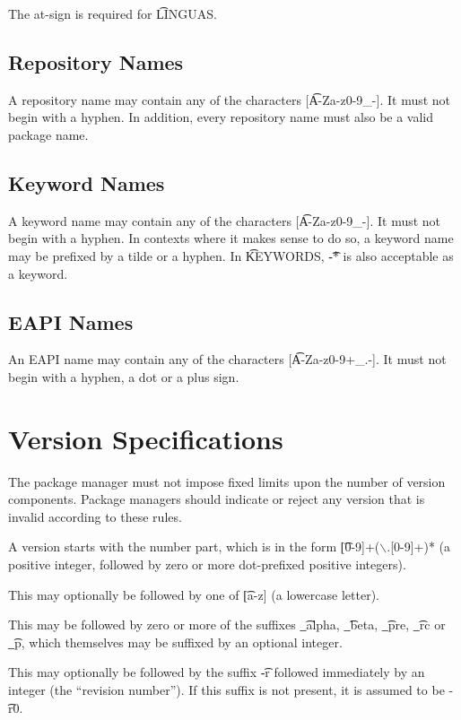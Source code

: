 \note The at-sign is required for \t{LINGUAS}.

\subsection{Repository Names}
\label{sec:repository-names}
A repository name may contain any of the characters [\t{A-Za-z0-9\_-}]. It must not begin with a
hyphen. In addition, every repository name must also be a valid package name.

\subsection{Keyword Names}
\label{sec:keyword-names}
A keyword name may contain any of the characters [\t{A-Za-z0-9\_-}]. It must not begin with a
hyphen. In contexts where it makes sense to do so, a keyword name may be prefixed by
a tilde or a hyphen. In \t{KEYWORDS}, \t{-*} is also acceptable as a keyword.

\subsection{EAPI Names}
\label{sec:eapi-names}
An EAPI name may contain any of the characters [\t{A-Za-z0-9+\_.-}]. It must not begin with a
hyphen, a dot or a plus sign.

\section{Version Specifications}
\label{sec:version-spec}
The package manager must not impose fixed limits upon the number of version components. Package
managers should indicate or reject any version that is invalid according to these rules.

A version starts with the number part, which is in the form \t{[0-9]+($\backslash$.[0-9]+)*} (a positive
integer, followed by zero or more dot-prefixed positive integers).

This may optionally be followed by one of \t{[a-z]} (a lowercase letter).

This may be followed by zero or more of the suffixes \t{\_alpha}, \t{\_beta}, \t{\_pre},
\t{\_rc} or \t{\_p}, which themselves may be suffixed by an optional integer.

This may optionally be followed by the suffix \t{-r} followed immediately by an integer (the
``revision number''). If this suffix is not present, it is assumed to be \t{-r0}.


